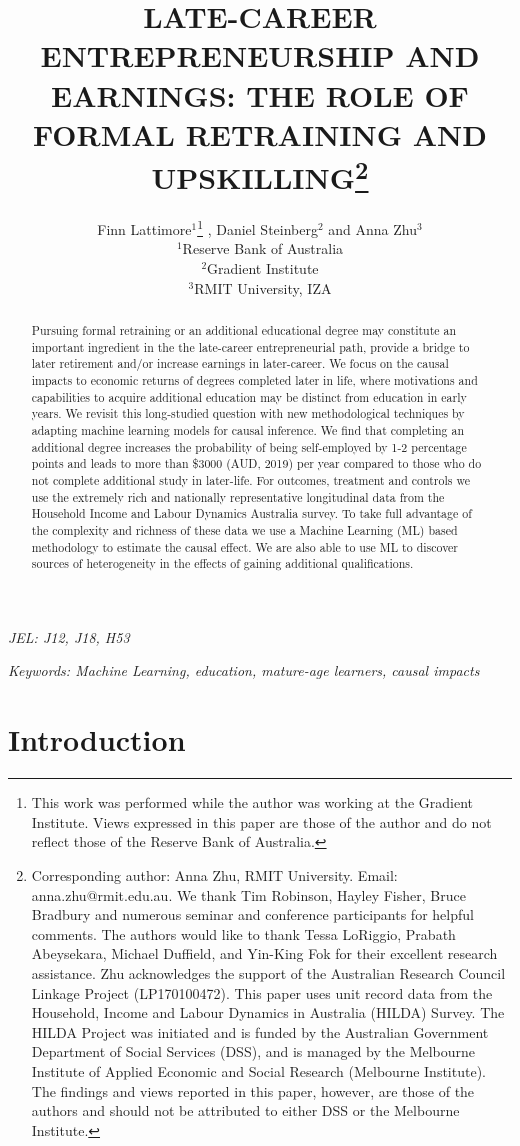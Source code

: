 \documentclass[12pt, a4paper]{article}
\title{LATE-CAREER ENTREPRENEURSHIP AND EARNINGS: THE ROLE OF FORMAL RETRAINING AND UPSKILLING\thanks{\scriptsize{Corresponding author: Anna Zhu, RMIT University. Email: anna.zhu@rmit.edu.au. \newline We thank Tim Robinson, Hayley Fisher, Bruce Bradbury and numerous seminar and conference participants for helpful comments. The authors would like to thank Tessa LoRiggio, Prabath Abeysekara, Michael Duffield, and Yin-King Fok for their excellent research assistance. \newline Zhu acknowledges the support of the Australian Research Council Linkage Project (LP170100472). This paper uses unit record data from the Household, Income and Labour Dynamics in Australia (HILDA) Survey. The HILDA Project was initiated and is funded by the Australian Government Department of Social Services (DSS), and is managed by the Melbourne Institute of Applied Economic and Social Research (Melbourne Institute). The findings and views reported in this paper, however, are those of the authors and should not be attributed to either DSS or the Melbourne Institute.}}} \vspace{0.2cm} \author{Finn Lattimore$^1$\thanks{\scriptsize{This work was performed while the author was working at the Gradient Institute. Views expressed in this paper are those of the author and do not reflect those of the Reserve Bank of Australia.}}\vspace{0.2cm} ,  Daniel Steinberg$^2$ and Anna Zhu$^3$ \\\small {$^1$Reserve Bank of Australia} \vspace{0.2cm} \\ {$^2$Gradient Institute} \vspace{0.2cm} \\ {$^3$RMIT University, IZA}}
\begin{document}

\maketitle


\begin{abstract}

  Pursuing formal retraining or an additional educational degree may constitute an important ingredient in the the late-career entrepreneurial path, provide a bridge to later retirement and/or increase earnings in later-career. We focus on the causal impacts to economic returns of degrees completed later in
  life, where motivations and capabilities to acquire additional education may
  be distinct from education in early years. We revisit this long-studied question with new methodological techniques by adapting machine learning models for causal inference. We find that completing an additional degree increases the probability of being self-employed by 1-2 percentage points and leads to more than \$3000 (AUD, 2019) per year compared to
  those who do not complete additional study in later-life. For outcomes, treatment and
  controls we use the extremely rich and nationally representative longitudinal
  data from the Household Income and Labour Dynamics Australia survey. 
  To take full advantage of the complexity and richness of these
  data we use a Machine Learning (ML) based methodology to estimate the causal
  effect. We are also able to use ML to discover sources of heterogeneity in
  the effects of gaining additional qualifications.

\end{abstract}


\emph{JEL: J12, J18, H53}

\emph{Keywords: Machine Learning, education, mature-age learners, causal impacts}


\clearpage
\onehalfspacing


\section{Introduction}
\end{document}
